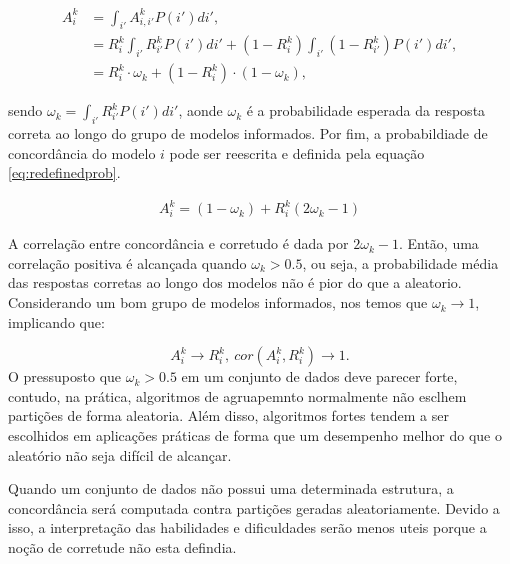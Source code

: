 \begin{align}\label{eq:aiilinhaunique}
A_{i}^k  &=  \int_{i'}   A_{i,i'}^k P(i')di',  \\  \nonumber
&= R_{i}^k \int_{i'} R_{i'}^k  P(i')di' + (1-R_{i}^k) \int_{i'}(1-R_{i'}^k)  P(i')di',\\ \nonumber
& = R_{i}^k\cdot \omega_{k} + (1-R_{i}^k)\cdot (1-\omega_{k}),  \nonumber
\end{align}

\noindent sendo $\omega_{k}  = \int_{i'} R_{i'}^k P(i')di'$, aonde  $\omega_{k}$ é a probabilidade esperada da resposta correta ao longo do grupo de modelos informados. Por fim, a probabildiade de concordância do modelo $i$ pode ser reescrita e definida pela equação \ref{eq:redefinedprob}.

\begin{align}\label{eq:redefinedprob}
    A_{i}^k = (1 - \omega_k) + R_{i}^k(2\omega_{k} -1)
\end{align}

A correlação entre concordância e corretudo é dada por $2\omega_{k} -1$. Então, uma correlação positiva é alcançada quando $\omega_{k} > 0.5$, ou seja,  a probabilidade média das respostas corretas ao longo dos modelos não é pior do que a aleatorio. Considerando um bom grupo de modelos informados, nos temos que $\omega_{k} \rightarrow 1$, implicando que:


\begin{equation}   A_{i}^k\rightarrow R_{i}^k,~ cor(A_{i}^k, R_{i}^k)  \rightarrow 1.
\end{equation}
O pressuposto que $\omega_{k} > 0.5$ em um conjunto de dados deve parecer forte, contudo, na prática, algoritmos de agruapemnto normalmente não esclhem partições de forma aleatoria. Além disso, algoritmos fortes tendem a ser escolhidos em aplicações práticas de forma que um desempenho melhor do que o aleatório não seja difícil de alcançar.

Quando um conjunto de dados não possui uma determinada estrutura, a concordância será computada  contra partições geradas aleatoriamente. Devido a isso, a interpretação  das habilidades e dificuldades serão menos uteis porque a noção de corretude não esta defindia.

